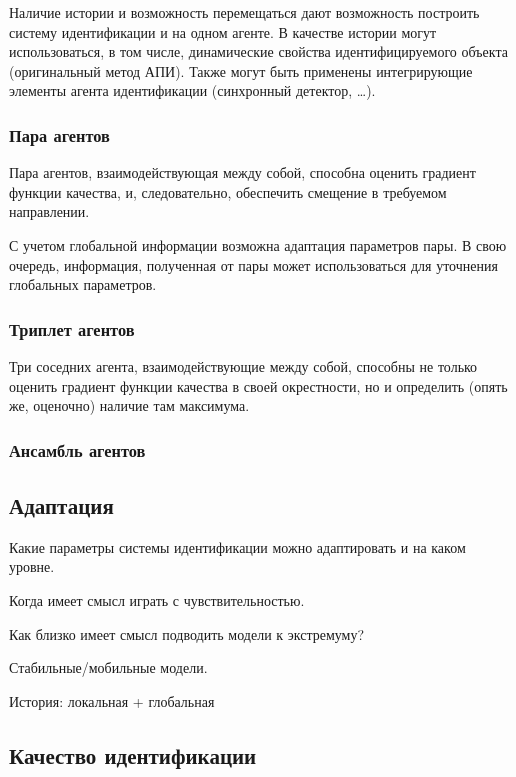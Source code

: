 \documentclass[a4paper,12pt]{article}
\begin{document}
Наличие истории и возможность перемещаться дают возможность
построить систему идентификации и на одном агенте.
В качестве истории могут использоваться, в том числе,
динамические свойства идентифицируемого объекта
(оригинальный метод АПИ). Также могут быть
применены интегрирующие элементы агента идентификации
(синхронный детектор, \ldots).

\subsubsection{Пара агентов}

Пара агентов, взаимодействующая между собой,
способна оценить градиент функции качества,
и, следовательно, обеспечить смещение в требуемом направлении.

С учетом глобальной информации возможна адаптация параметров пары.
В свою очередь, информация, полученная от пары может
использоваться для уточнения глобальных параметров.

\subsubsection{Триплет агентов}

Три соседних агента, взаимодействующие между собой,
способны не только оценить градиент функции качества в своей окрестности,
но и определить (опять же, оценочно) наличие там максимума.

\subsubsection{Ансамбль агентов}

\subsection{Адаптация}

Какие параметры системы идентификации можно адаптировать
и на каком уровне.

Когда имеет смысл играть с чувствительностью.

Как близко имеет смысл подводить модели к экстремуму?


Стабильные/мобильные модели.

История: локальная + глобальная

\subsection{Качество идентификации}
\end{document}
